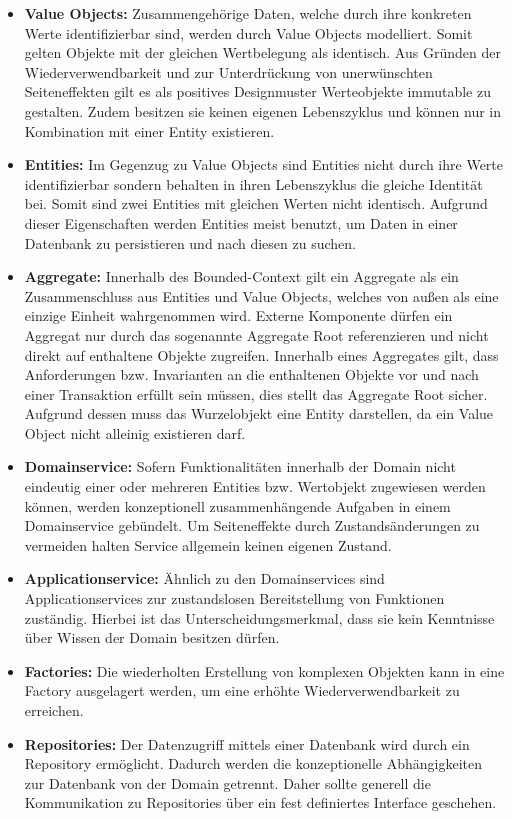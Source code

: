 \begin{itemize}[]
	\item \textbf{Value Objects: } {Zusammengehörige Daten, welche durch ihre konkreten Werte identifizierbar sind, werden durch Value Objects modelliert. Somit gelten Objekte mit der gleichen Wertbelegung als identisch. Aus Gründen der Wiederverwendbarkeit und zur Unterdrückung von unerwünschten Seiteneffekten gilt es als positives Designmuster Werteobjekte \gls{immutable} zu gestalten. Zudem besitzen sie keinen eigenen Lebenszyklus und können nur in Kombination mit einer Entity existieren.}
	\item \textbf{Entities: } {Im Gegenzug zu Value Objects sind Entities nicht durch ihre Werte identifizierbar sondern behalten in ihren Lebenszyklus die gleiche Identität bei. Somit sind zwei Entities mit gleichen Werten nicht identisch. Aufgrund dieser Eigenschaften werden Entities meist benutzt, um Daten in einer Datenbank zu persistieren und nach diesen zu suchen.}
	\item \textbf{Aggregate: } {Innerhalb des Bounded-Context gilt ein Aggregate als ein Zusammenschluss aus Entities und Value Objects, welches von außen als eine einzige Einheit wahrgenommen wird. Externe Komponente dürfen ein Aggregat nur durch das sogenannte Aggregate Root referenzieren und nicht direkt auf enthaltene Objekte zugreifen. Innerhalb eines Aggregates gilt, dass Anforderungen bzw. Invarianten an die enthaltenen Objekte vor und nach einer Transaktion erfüllt sein müssen, dies stellt das Aggregate Root sicher. Aufgrund dessen muss das Wurzelobjekt eine Entity darstellen, da ein Value Object nicht alleinig existieren darf. } %
	\item \textbf{Domainservice: } {Sofern Funktionalitäten innerhalb der Domain nicht eindeutig einer oder mehreren Entities bzw. Wertobjekt zugewiesen werden können, werden konzeptionell zusammenhängende Aufgaben in einem Domainservice gebündelt. Um Seiteneffekte durch Zustandsänderungen zu vermeiden halten Service allgemein keinen eigenen Zustand.}
	\item \textbf{Applicationservice: } {Ähnlich zu den Domainservices sind Applicationservices zur zustandslosen Bereitstellung von Funktionen zuständig. Hierbei ist das Unterscheidungsmerkmal, dass sie kein Kenntnisse über Wissen der Domain besitzen dürfen.} %
	\item \textbf{Factories: } {Die wiederholten Erstellung von komplexen Objekten kann in eine Factory ausgelagert werden, um eine erhöhte Wiederverwendbarkeit zu erreichen. }
	\item \textbf{Repositories: } {Der Datenzugriff mittels einer Datenbank wird durch ein Repository ermöglicht. Dadurch werden die konzeptionelle Abhängigkeiten zur Datenbank von der Domain getrennt. Daher sollte generell die Kommunikation zu Repositories über ein fest definiertes Interface geschehen.}
\end{itemize}

